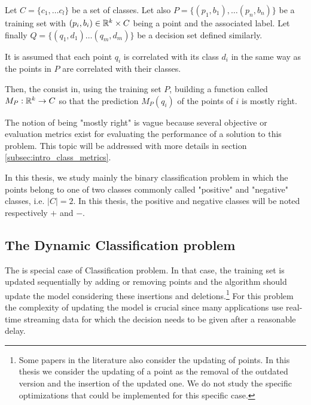 \begin{definition} 
    Let $C = \{c_1, \dots c_l\}$ be a set of classes. Let also $P = \{(p_1, b_1), \dots (p_n, b_n)\}$ be a training set with $(p_i, b_i) \in \mathbb{R}^k \times C$ being a point and the associated label. Let finally $Q = \{(q_1, d_1) \dots (q_m, d_m)\}$ be a decision set defined similarly.
    
    It is assumed that each point $q_i$ is correlated with its class $d_i$ in the same way as the points in $P$ are correlated with their classes.

    Then, the  consist in, using the training set $P$, building a function called  $M_P : \mathbb{R}^k \rightarrow C$ so that the prediction $M_P(q_i)$ of the points of $i$ is mostly right.
\end{definition}

The notion of being "mostly right" is vague because several objective or evaluation metrics exist for evaluating the performance of a solution to this problem. This topic will be addressed with more details in section \ref{subsec:intro_class_metrics}.

In this thesis, we study mainly the binary classification problem in which the points belong to one of two classes commonly called "positive" and "negative" classes, i.e. $|C| = 2$. In this thesis, the positive and negative classes will be noted respectively $+$ and $-$. 

\subsection{The Dynamic Classification problem}
The  is special case of Classification problem. In that case, the training set is updated sequentially by adding or removing points and the algorithm should update the model considering these insertions and deletions.\footnote{Some papers in the literature also consider the updating of points. In this thesis we consider the updating of a point as the removal of the outdated version and the insertion of the updated one. We do not study the specific optimizations that could be implemented for this specific case.} For this problem the complexity of updating the model is crucial since many applications use real-time streaming data for which the decision needs to be given after a reasonable delay.

